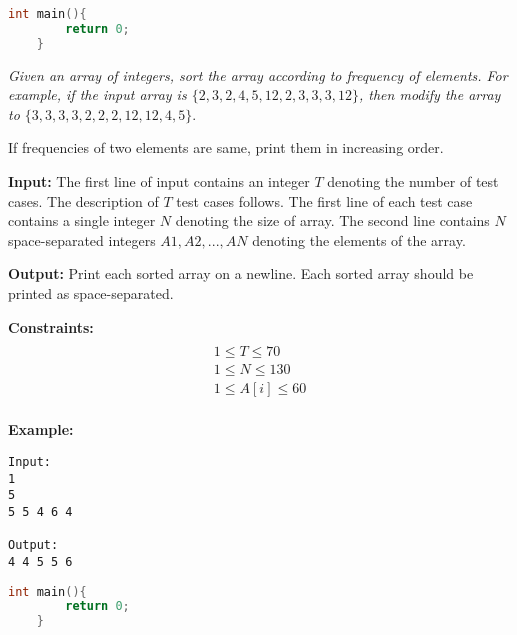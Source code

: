 \begin{solution}
\begin{lstlisting}[language=C++, caption="C++ Solution"]
	int main(){
		return 0;	
	}
\end{lstlisting}

\end{solution}


\begin{problem}
\textit{Given an array of integers, sort the array according to frequency of elements. For example, if the input array is $\{2, 3, 2, 4, 5, 12, 2, 3, 3, 3, 12\}$, then modify the array to $\{3, 3, 3, 3, 2, 2, 2, 12, 12, 4, 5\}$}. 

If frequencies of two elements are same, print them in increasing order.

\textbf{Input:}
The first line of input contains an integer $T$ denoting the number of test cases. The description of $T$ test cases follows. The first line of each test case contains a single integer $N$ denoting the size of array. The second line contains $N$ space-separated integers $A1, A2, ..., AN$ denoting the elements of the array.

\textbf{Output:}
Print each sorted array on a newline. Each sorted array should be printed as space-separated.

\textbf{Constraints:}
\begin{multline}\\
1 \leq T \leq 70\\
1 \leq N \leq 130\\
1 \leq A[i] \leq 60\\
\end{multline}

\textbf{Example:}
\begin{verbatim}
Input:
1
5
5 5 4 6 4

Output:
4 4 5 5 6 

\end{verbatim}

\end{problem}

\begin{solution}
\begin{lstlisting}[language=C++, caption="C++ Solution"]
	int main(){
		return 0;	
	}
\end{lstlisting}

\end{solution}



